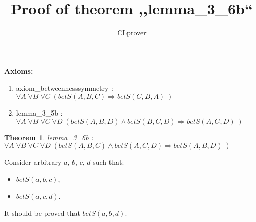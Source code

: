 \documentclass{article}
\newtheorem{theorem}{Theorem}
\begin{document}
\title{Proof of theorem ,,lemma\_3\_6b``}
\author{CLprover}
\maketitle

\noindent 
{\bfseries Axioms:} 
\begin{enumerate}
\item axiom\_betweennesssymmetry : $\forall A \; \forall B \; \forall C \; ( betS(A, B, C) \Rightarrow betS(C, B, A)\;)$
\item lemma\_3\_5b : $\forall A \; \forall B \; \forall C \; \forall D \; ( betS(A, B, D)\wedge betS(B, C, D) \Rightarrow betS(A, C, D)\;)$
\end{enumerate}

\hrulefill

\begin{theorem}
lemma\_3\_6b : $\forall A \; \forall B \; \forall C \; \forall D \; ( betS(A, B, C)\wedge betS(A, C, D) \Rightarrow betS(A, B, D)\;)$
\end{theorem}

\setcounter{proofstepnum}{0}

\vspace{5pt}

\noindent Consider arbitrary $a$, $b$, $c$, $d$ such that: \begin{itemize} 

\item  $betS(a, b, c)$, 
\item  $betS(a, c, d)$. 
\end{itemize} 
It should be proved that $betS(a, b, d)$.
\vspace{5pt}


\vspace{5pt}
\noindent

% 
\end{document}
